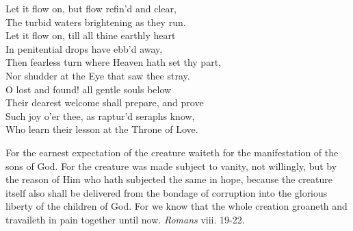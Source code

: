  Let it flow on, but flow refin’d and clear, \\
 The turbid waters brightening as they run. \\
  Let it flow on, till all thine earthly heart \\
 In penitential drops have ebb’d away, \\
 Then fearless turn where Heaven hath set thy part, \\
 Nor shudder at the Eye that saw thee stray. \\
  O lost and found! all gentle souls below \\
 Their dearest welcome shall prepare, and prove \\
 Such joy o’er thee, as raptur’d seraphs know, \\
 Who learn their lesson at the Throne of Love.\\


For the earnest expectation of the creature waiteth for the manifestation of the sons of God. For the creature was made subject to vanity, not willingly, but by the reason of Him who hath subjected the same in hope, because the creature itself also shall be delivered from the bondage of corruption into the glorious liberty of the children of God. For we know that the whole creation groaneth and travaileth in pain together until now. \emph{Romans} viii. 19-22.

